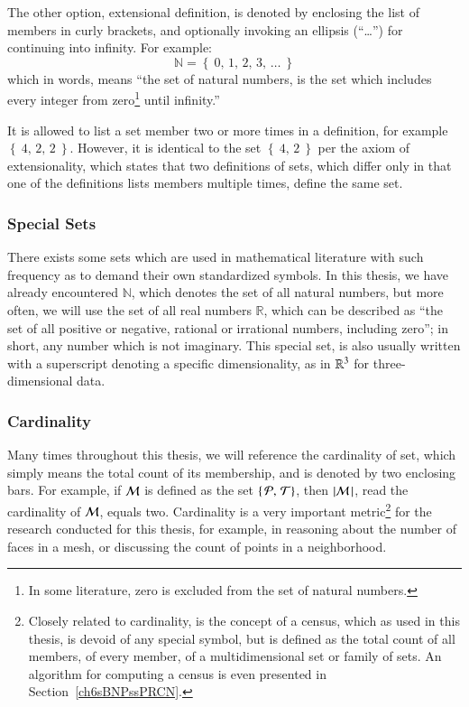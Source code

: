 The other option, extensional definition, is denoted by enclosing the list of members in curly brackets, and optionally invoking an ellipsis (``\dots'') for continuing into infinity. For example:
%
\begin{equation}
	\mathbb{N} = \left \{\:0,\,1,\,2,\,3,\,\ldots\:\right \}
\end{equation}
%
which in words, means ``the set of natural numbers, is the set which includes every integer from zero\footnote{In some literature, zero is excluded from the set of natural numbers.} until infinity.''

It is allowed to list a set member two or more times in a definition, for example $\left \{\:4,\,2,\,2\:\right \}$. However, it is identical to the set $\left \{\:4,\,2\:\right \}$ per the axiom of extensionality, which states that two definitions of sets, which differ only in that one of the definitions lists members multiple times, define the same set.

%
%
\subsubsection{Special Sets}
\label{ch2sETBssSTsssSS}
There exists some sets which are used in mathematical literature with such frequency as to demand their own standardized symbols. In this thesis, we have already encountered $\mathbb{N}$, which denotes the set of all natural numbers, but more often, we will use the set of all real numbers $\mathbb{R}$, which can be described as ``the set of all positive or negative, rational or irrational numbers, including zero''; in short, any number which is not imaginary. This special set, is also usually written with a superscript denoting a specific dimensionality, as in $\mathbb{R}^{3}$ for three-dimensional data.

%
%
\subsubsection{Cardinality}
\label{ch2sETBssSTsssC}
Many times throughout this thesis, we will reference the cardinality of set, which simply means the total count of its membership, and is denoted by two enclosing bars. For example, if $\mathcal{M}$ is defined as the set $\left \{\,\mathcal{P},\,\mathcal{T}\right \}$, then $|\mathcal{M}\,| $, read the cardinality of $\mathcal{M}$, equals two. Cardinality is a very important metric\footnote{Closely related to cardinality, is the concept of a census, which as used in this thesis, is devoid of any special symbol, but is defined as the total count of all members, of every member, of a multidimensional set or family of sets. An algorithm for computing a census is even presented in Section~\ref{ch6sBNPssPRCN}.} for the research conducted for this thesis, for example, in reasoning about the number of faces in a mesh, or discussing the count of points in a neighborhood.

